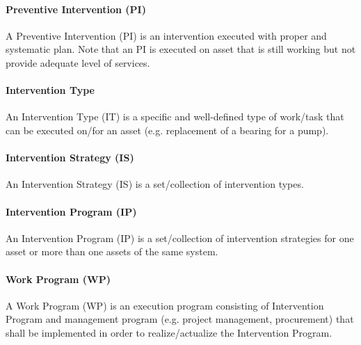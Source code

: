\paragraph{\textbf{Preventive Intervention (PI)}}
A Preventive Intervention (PI) is an intervention executed with proper and systematic plan. Note that an PI is executed on asset that is still working but not provide adequate level of services.

\paragraph{\textbf{Intervention Type}}
An Intervention Type (IT) is a specific and well-defined type of work/task that can be executed on/for an asset (e.g. replacement of a bearing for a pump).

\paragraph{\textbf{Intervention Strategy (IS)}}
An Intervention Strategy (IS) is a set/collection of intervention types.

\paragraph{\textbf{Intervention Program (IP)}}
An Intervention Program (IP) is a set/collection of intervention strategies for one asset or more than one assets of the same system.

\paragraph{\textbf{Work Program (WP)}}
A Work Program (WP) is an execution program consisting of Intervention Program and management program (e.g. project management, procurement) that shall be implemented in order to realize/actualize the Intervention Program.


